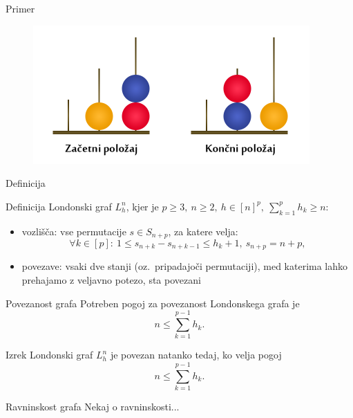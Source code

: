 \documentclass{beamer}
\begin{document}
\begin{frame}{Primer}
    \begin{figure}
        \centering
        \includegraphics[height=150pt]{../img/london-tower.png}
    \end{figure}
\end{frame}

\begin{frame}{Definicija}
    \begin{block}{Definicija}
        \alert{Londonski graf} $L_h^n$, kjer je $p \geq 3,\ n \geq 2,\ h \in [n]^p,\  \sum_{k=1}^p h_k \geq n$:
        \begin{itemize}
            \item vozlišča: vse permutacije $s \in S_{n+p}$, za katere velja:
            \[\forall k \in [p]:\ 1 \leq s_{n+k} - s_{n+k-1} \leq h_k + 1,\ s_{n+p} = n + p ,\]
            \item povezave: vsaki dve stanji (oz.\ pripadajoči permutaciji), med katerima lahko prehajamo z veljavno potezo, sta povezani
        \end{itemize}
    \end{block}

\end{frame}

\begin{frame}{Povezanost grafa}
    Potreben pogoj za povezanost Londonskega grafa je 
    \[ n \leq \sum_{k=1}^{p-1} h_k. \]
    \begin{block}{Izrek}
        Londonski graf $L_h^n$ je povezan natanko tedaj, ko velja pogoj
        \[ n \leq \sum_{k=1}^{p-1} h_k. \]
    \end{block}
\end{frame}

\begin{frame}{Ravninskost grafa}
	Nekaj o ravninskosti...
\end{frame}
\end{document}
